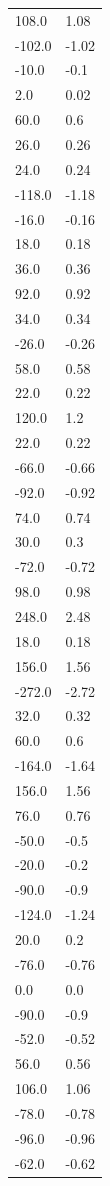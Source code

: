 \begin{longtable}{ll}
108.0 & 1.08 \\
-102.0 & -1.02 \\
-10.0 & -0.1 \\
2.0 & 0.02 \\
60.0 & 0.6 \\
26.0 & 0.26 \\
24.0 & 0.24 \\
-118.0 & -1.18 \\
-16.0 & -0.16 \\
18.0 & 0.18 \\
36.0 & 0.36 \\
92.0 & 0.92 \\
34.0 & 0.34 \\
-26.0 & -0.26 \\
58.0 & 0.58 \\
22.0 & 0.22 \\
120.0 & 1.2 \\
22.0 & 0.22 \\
-66.0 & -0.66 \\
-92.0 & -0.92 \\
74.0 & 0.74 \\
30.0 & 0.3 \\
-72.0 & -0.72 \\
98.0 & 0.98 \\
248.0 & 2.48 \\
18.0 & 0.18 \\
156.0 & 1.56 \\
-272.0 & -2.72 \\
32.0 & 0.32 \\
60.0 & 0.6 \\
-164.0 & -1.64 \\
156.0 & 1.56 \\
76.0 & 0.76 \\
-50.0 & -0.5 \\
-20.0 & -0.2 \\
-90.0 & -0.9 \\
-124.0 & -1.24 \\
20.0 & 0.2 \\
-76.0 & -0.76 \\
0.0 & 0.0 \\
-90.0 & -0.9 \\
-52.0 & -0.52 \\
56.0 & 0.56 \\
106.0 & 1.06 \\
-78.0 & -0.78 \\
-96.0 & -0.96 \\
-62.0 & -0.62 \\

\end{longtable}
